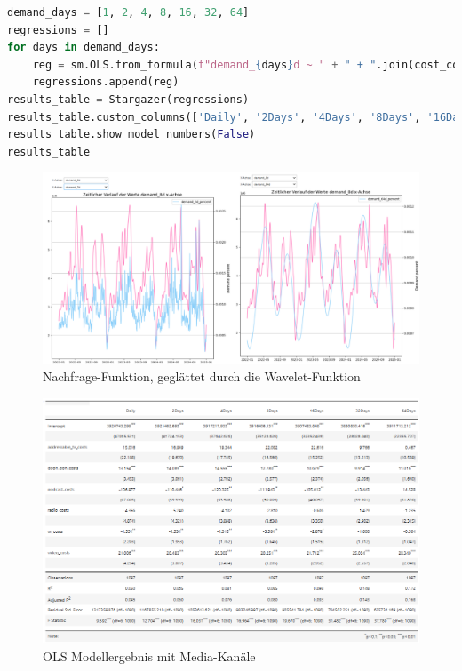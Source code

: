 \begin{lstlisting}[language=Python, linewidth=\textwidth]
demand_days = [1, 2, 4, 8, 16, 32, 64]
regressions = []
for days in demand_days:
    reg = sm.OLS.from_formula(f"demand_{days}d ~ " + " + ".join(cost_columns), df_wlt_decomp).fit()
    regressions.append(reg)
results_table = Stargazer(regressions)
results_table.custom_columns(['Daily', '2Days', '4Days', '8Days', '16Days', '32Days', '64Days'], [1, 1, 1, 1, 1, 1, 1])
results_table.show_model_numbers(False)
results_table
\end{lstlisting}
\label{lst:stargazer}
\begin{figure}[H]
    \centering
    \includegraphics[width=1\linewidth]{images/wavelet.png}
    \caption{Nachfrage-Funktion, geglättet durch die Wavelet-Funktion}
    \label{fig:wavelet}
\end{figure}
\begin{figure}
    \centering
    \includegraphics[width=1\linewidth]{images/ols1.png}
    \caption{\ac{OLS} Modellergebnis mit Media-Kanäle}
    \label{fig:ols1}
\end{figure}
